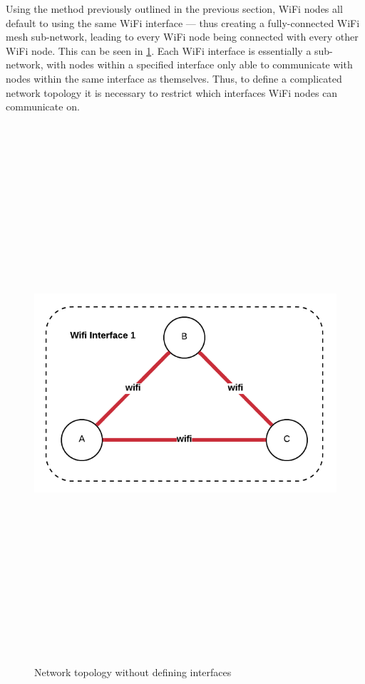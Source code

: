 Using the method previously outlined in the previous section, WiFi nodes all default to using the same WiFi interface — thus creating a fully-connected WiFi mesh sub-network, leading to every WiFi node being connected with every other WiFi node.
This can be seen in \figurename{ \ref{fig:networkWifi1}}.
Each WiFi interface is essentially a sub-network, with nodes within a specified interface only able to communicate with nodes within the same interface as themselves.
Thus, to define a complicated network topology it is necessary to restrict which interfaces WiFi nodes can communicate on.

\begin{figure}
    \begin{centering}
        \includegraphics[width=14cm,height=20cm,keepaspectratio]{Figures/networkWifiInterface1.png}
        \caption{Network topology without defining interfaces}
        \label{fig:networkWifi1}
    \end{centering}
\end{figure}

